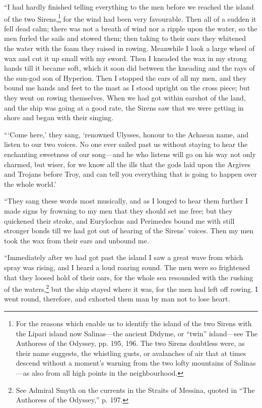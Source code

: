 “I had hardly finished telling everything to the men before we reached the
island of the two Sirens,\footnote{For the reasons which enable us to identify the island of the two Sirens
with the Lipari island now Salinas—the ancient Didyme, or “twin” island—see
The Authoress of the Odyssey, pp. 195, 196. The two Sirens doubtless were, as
their name suggests, the whistling gusts, or avalanches of air that at times
descend without a moment’s warning from the two lofty mountains of Salinas—as
also from all high points in the neighbourhood.} for the wind had been very
favourable. Then all of a sudden it fell dead calm; there was not a breath of
wind nor a ripple upon the water, so the men furled the sails and stowed them;
then taking to their oars they whitened the water with the foam they raised in
rowing. Meanwhile I look a large wheel of wax and cut it up small with my
sword. Then I kneaded the wax in my strong hands till it became soft, which it
soon did between the kneading and the rays of the sun-god son of Hyperion. Then
I stopped the ears of all my men, and they bound me hands and feet to the mast
as I stood upright on the cross piece; but they went on rowing themselves. When
we had got within earshot of the land, and the ship was going at a good rate,
the Sirens saw that we were getting in shore and began with their singing.

“‘Come here,’ they sang, ‘renowned Ulysses, honour to the Achaean name, and
listen to our two voices. No one ever sailed past us without staying to hear
the enchanting sweetness of our song—and he who listens will go on his way not
only charmed, but wiser, for we know all the ills that the gods laid upon the
Argives and Trojans before Troy, and can tell you everything that is going to
happen over the whole world.’

“They sang these words most musically, and as I longed to hear them further I
made signs by frowning to my men that they should set me free; but they
quickened their stroke, and Eurylochus and Perimedes bound me with still
stronger bonds till we had got out of hearing of the Sirens’ voices. Then my
men took the wax from their ears and unbound me.

“Immediately after we had got past the island I saw a great wave from which
spray was rising, and I heard a loud roaring sound. The men were so frightened
that they loosed hold of their oars, for the whole sea resounded with the
rushing of the waters,\footnote{See Admiral Smyth on the currents in the Straits of Messina, quoted in “The
Authoress of the Odyssey,” p. 197.} but the ship stayed where it was,
for the men had left off rowing. I went round, therefore, and exhorted them man
by man not to lose heart.

